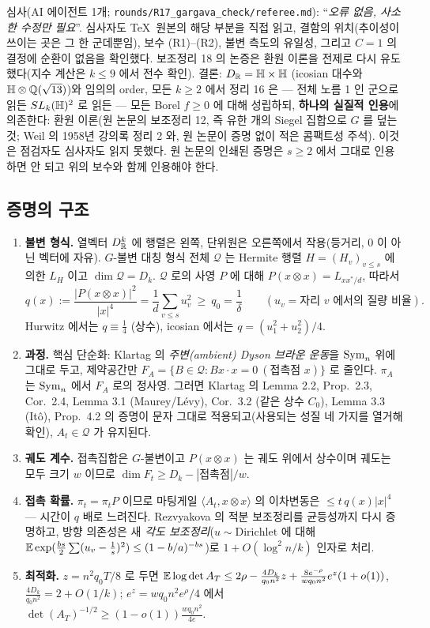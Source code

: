 심사(AI 에이전트 1개; \texttt{rounds/R17\_gargava\_check/referee.md}): ``\emph{오류 없음, 사소한 수정만 필요}''. 심사자도 \TeX\ 원본의 해당 부분을 직접 읽고, 결함의 위치(추이성이 쓰이는 곳은 그 한 군데뿐임), 보수 (R1)--(R2), 불변 측도의 유일성, 그리고 $C=1$ 의 결정에 순환이 없음을 확인했다. 보조정리 18 의 논증은 환원 이론을 전제로 다시 유도했다(지수 계산은 $k\le9$ 에서 전수 확인). 결론: $D_{\mathbb{R}}=\mathbb{H}\times\mathbb{H}$ (icosian 대수와 $\mathbb{H}\otimes\mathbb{Q}(\sqrt{13})$)와 임의의 order, 모든 $k\ge2$ 에서 정리 16 은 --- 전체 노름 1 인 군으로 읽든 $SL_k(\mathbb{H})^2$ 로 읽든 --- 모든 Borel $f\ge0$ 에 대해 성립하되, \textbf{하나의 실질적 인용}에 의존한다: 환원 이론(원 논문의 보조정리 12, 즉 유한 개의 Siegel 집합으로 $G$ 를 덮는 것; Weil 의 1958년 강의록 정리 2 와, 원 논문이 증명 없이 적은 콤팩트성 주석). 이것은 점검자도 심사자도 읽지 못했다. 원 논문의 인쇄된 증명은 $s\ge2$ 에서 그대로 인용하면 안 되고 위의 보수와 함께 인용해야 한다.

\subsection{증명의 구조}
\begin{enumerate}
\item \textbf{불변 형식.} 열벡터 $D_{\mathbb{R}}^k$ 에 행렬은 왼쪽, 단위원은 오른쪽에서 작용(등거리, 0 이 아닌 벡터에 자유). $G$-불변 대칭 형식 전체 $\mathcal Q$ 는 Hermite 행렬 $H=(H_v)_{v\le s}$ 에 의한 $L_H$ 이고 $\dim\mathcal Q=D_k$. $\mathcal Q$ 로의 사영 $P$ 에 대해 $P(x\otimes x)=L_{xx^*/d}$, 따라서
\[
q(x):=\frac{|P(x\otimes x)|^2}{|x|^4}=\frac1d\sum_{v\le s}u_v^2\ \ge\ q_0=\frac1\delta\qquad(u_v=\text{자리 }v\text{ 에서의 질량 비율}).
\]
Hurwitz 에서는 $q\equiv\tfrac14$ (상수), icosian 에서는 $q=(u_1^2+u_2^2)/4$.
\item \textbf{과정.} 핵심 단순화: Klartag 의 \emph{주변(ambient) Dyson 브라운 운동}을 $\mathrm{Sym}_n$ 위에 그대로 두고, 제약공간만 $F_A=\{B\in\mathcal Q:Bx\cdot x=0\ (\text{접촉점 }x)\}$ 로 줄인다. $\pi_A$ 는 $\mathrm{Sym}_n$ 에서 $F_A$ 로의 정사영. 그러면 Klartag 의 Lemma 2.2, Prop.\ 2.3, Cor.\ 2.4, Lemma 3.1 (Maurey/L\'evy), Cor.\ 3.2 (같은 상수 $C_0$), Lemma 3.3 (It\^o), Prop.\ 4.2 의 증명이 문자 그대로 적용되고(사용되는 성질 네 가지를 열거해 확인), $A_t\in\mathcal Q$ 가 유지된다.
\item \textbf{궤도 계수.} 접촉집합은 $G$-불변이고 $P(x\otimes x)$ 는 궤도 위에서 상수이며 궤도는 모두 크기 $w$ 이므로 $\dim F_t\ge D_k-|\text{접촉점}|/w$.
\item \textbf{접촉 확률.} $\pi_t=\pi_tP$ 이므로 마팅게일 $\langle A_t,x\otimes x\rangle$ 의 이차변동은 $\le t\,q(x)|x|^4$ --- 시간이 $q$ 배로 느려진다. Rezvyakova 의 적분 보조정리를 균등성까지 다시 증명하고, 방향 의존성은 새 \emph{각도 보조정리}($u\sim\mathrm{Dirichlet}$ 에 대해 $\mathbb{E}\exp(\tfrac{bs}2\sum(u_v-\tfrac1s)^2)\le(1-b/a)^{-bs}$)로 $1+O(\log^2n/k)$ 인자로 처리.
\item \textbf{최적화.} $z=n^2q_0T/8$ 로 두면 $\mathbb{E}\log\det A_T\le2\rho-\tfrac{4D_k}{q_0n^2}z+\tfrac{8e^{-\rho}}{wq_0n^2}e^z(1+o(1))$, $\tfrac{4D_k}{q_0n^2}=2+O(1/k)$; $e^z=wq_0n^2e^\rho/4$ 에서 $\det(A_T)^{-1/2}\ge(1-o(1))\tfrac{wq_0n^2}{4e}$.
\end{enumerate}

